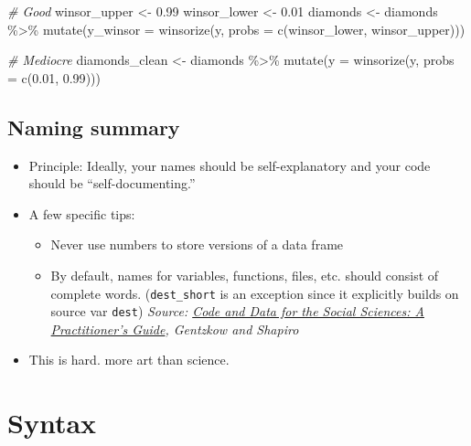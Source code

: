 \documentclass[
  letterpaper,
  DIV=11,
  numbers=noendperiod]{scrreprt}
\newenvironment{Shaded}{}{}
\newcommand{\AttributeTok}[1]{\textcolor[rgb]{0.49,0.56,0.16}{#1}}
\newcommand{\CommentTok}[1]{\textcolor[rgb]{0.38,0.63,0.69}{\textit{#1}}}
\newcommand{\FloatTok}[1]{\textcolor[rgb]{0.25,0.63,0.44}{#1}}
\newcommand{\FunctionTok}[1]{\textcolor[rgb]{0.02,0.16,0.49}{#1}}
\newcommand{\NormalTok}[1]{#1}
\newcommand{\OtherTok}[1]{\textcolor[rgb]{0.00,0.44,0.13}{#1}}
\newcommand{\SpecialCharTok}[1]{\textcolor[rgb]{0.25,0.44,0.63}{#1}}
\providecommand{\tightlist}{%
  \setlength{\itemsep}{0pt}\setlength{\parskip}{0pt}}\usepackage{longtable,booktabs,array}
\begin{document}
\begin{Shaded}
\begin{Highlighting}[]
\CommentTok{\# Good}
\NormalTok{winsor\_upper }\OtherTok{\textless{}{-}} \FloatTok{0.99}
\NormalTok{winsor\_lower }\OtherTok{\textless{}{-}} \FloatTok{0.01}
\NormalTok{diamonds }\OtherTok{\textless{}{-}}
\NormalTok{  diamonds }\SpecialCharTok{\%\textgreater{}\%}
  \FunctionTok{mutate}\NormalTok{(}\AttributeTok{y\_winsor =} \FunctionTok{winsorize}\NormalTok{(y, }\AttributeTok{probs =} \FunctionTok{c}\NormalTok{(winsor\_lower, winsor\_upper)))}

\CommentTok{\# Mediocre}
\NormalTok{diamonds\_clean }\OtherTok{\textless{}{-}}
\NormalTok{  diamonds }\SpecialCharTok{\%\textgreater{}\%}
  \FunctionTok{mutate}\NormalTok{(}\AttributeTok{y =} \FunctionTok{winsorize}\NormalTok{(y, }\AttributeTok{probs =} \FunctionTok{c}\NormalTok{(}\FloatTok{0.01}\NormalTok{, }\FloatTok{0.99}\NormalTok{)))}
\end{Highlighting}
\end{Shaded}

\subsection{Naming summary}\label{naming-summary}

\begin{itemize}
\tightlist
\item
  Principle: Ideally, your names should be self-explanatory and your
  code should be ``self-documenting.''
\item
  A few specific tips:

  \begin{itemize}
  \tightlist
  \item
    Never use numbers to store versions of a data frame
  \item
    By default, names for variables, functions, files, etc. should
    consist of complete words. (\texttt{dest\_short} is an exception
    since it explicitly builds on source var \texttt{dest})
    \emph{Source:
    \href{https://web.stanford.edu/~gentzkow/research/CodeAndData.pdf}{Code
    and Data for the Social Sciences: A Practitioner's Guide}, Gentzkow
    and Shapiro}
  \end{itemize}
\item
  This is hard. more art than science.
\end{itemize}

\section{Syntax}\label{syntax}
\end{document}
